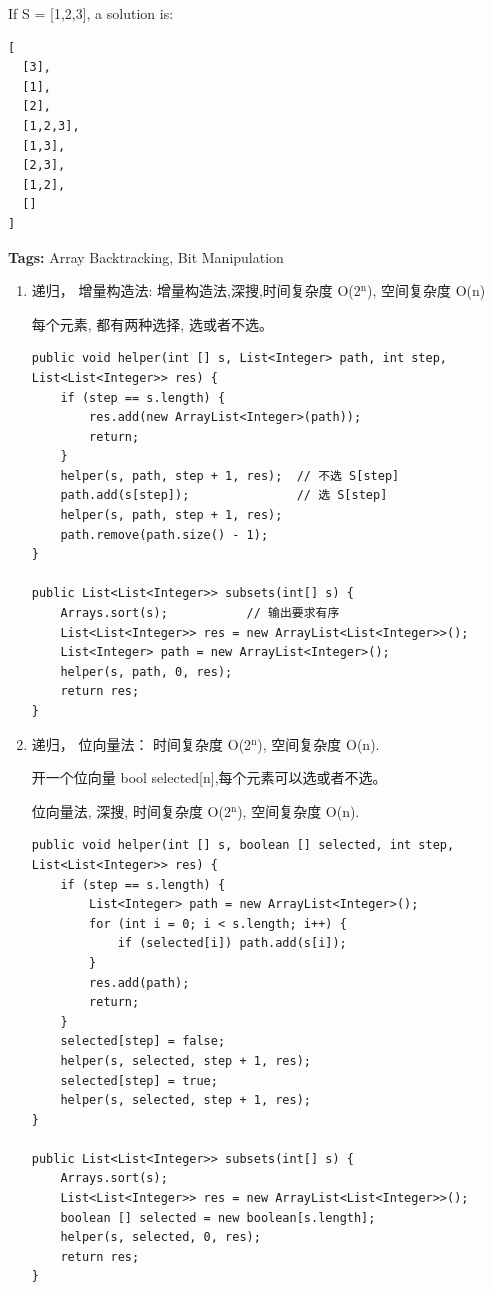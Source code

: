 \documentclass[12pt]{book}
\begin{document}
If S = [1,2,3], a solution is:
\lstset{language=java,label= ,caption= ,numbers=none}
\begin{lstlisting}
[
  [3],
  [1],
  [2],
  [1,2,3],
  [1,3],
  [2,3],
  [1,2],
  []
]
\end{lstlisting}

\textbf{Tags:} Array Backtracking, Bit Manipulation

\begin{enumerate}
\item 递归， 增量构造法: 增量构造法,深搜,时间复杂度 O(2$^{\text{n}}$), 空间复杂度 O(n)
\label{sec-9-1-1-1}

每个元素, 都有两种选择, 选或者不选。

\lstset{language=java,label= ,caption= ,numbers=none}
\begin{lstlisting}
public void helper(int [] s, List<Integer> path, int step, List<List<Integer>> res) {
    if (step == s.length) {
        res.add(new ArrayList<Integer>(path));
        return;   
    }
    helper(s, path, step + 1, res);  // 不选 S[step]
    path.add(s[step]);               // 选 S[step]
    helper(s, path, step + 1, res);
    path.remove(path.size() - 1);
}
        
public List<List<Integer>> subsets(int[] s) {
    Arrays.sort(s);           // 输出要求有序
    List<List<Integer>> res = new ArrayList<List<Integer>>();
    List<Integer> path = new ArrayList<Integer>();
    helper(s, path, 0, res);
    return res;
}
\end{lstlisting}
\item 递归， 位向量法： 时间复杂度 O(2$^{\text{n}}$), 空间复杂度 O(n).
\label{sec-9-1-1-2}

开一个位向量 bool selected[n],每个元素可以选或者不选。

位向量法, 深搜, 时间复杂度 O(2$^{\text{n}}$), 空间复杂度 O(n). 

\lstset{language=java,label= ,caption= ,numbers=none}
\begin{lstlisting}
public void helper(int [] s, boolean [] selected, int step, List<List<Integer>> res) {
    if (step == s.length) {
        List<Integer> path = new ArrayList<Integer>();
        for (int i = 0; i < s.length; i++) {
            if (selected[i]) path.add(s[i]);
        }
        res.add(path);
        return;   
    }
    selected[step] = false;
    helper(s, selected, step + 1, res);
    selected[step] = true;
    helper(s, selected, step + 1, res);
}
        
public List<List<Integer>> subsets(int[] s) {
    Arrays.sort(s); 
    List<List<Integer>> res = new ArrayList<List<Integer>>();
    boolean [] selected = new boolean[s.length];
    helper(s, selected, 0, res);
    return res;
}
\end{lstlisting}


\end{enumerate}
\end{document}
